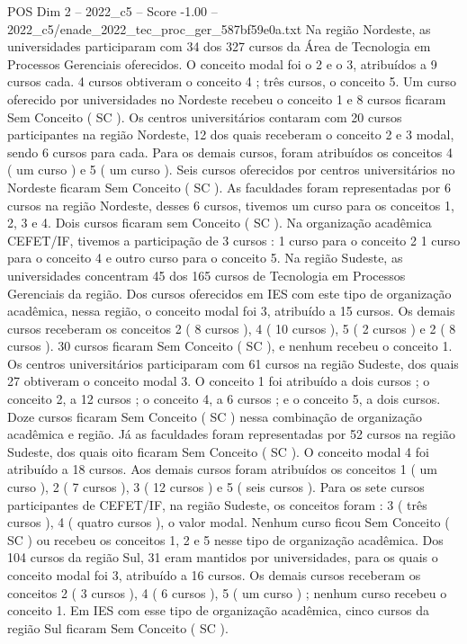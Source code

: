 \begin{textsample}{POS Dim 2 – 2022\_c5 – Score -1.00 – 2022\_c5/enade\_2022\_tec\_proc\_ger\_587bf59e0a.txt}
Na região Nordeste, as universidades participaram com 34 dos 327 cursos da Área de Tecnologia em Processos Gerenciais oferecidos.
O conceito modal foi o 2 e o 3, atribuídos a 9 cursos cada. 4 cursos obtiveram o conceito 4 ; três cursos, o conceito 5.
Um curso oferecido por universidades no Nordeste recebeu o conceito 1 e 8 cursos ficaram Sem Conceito ( SC ).
Os centros universitários contaram com 20 cursos participantes na região Nordeste, 12 dos quais receberam o conceito 2 e 3 modal, sendo 6 cursos para cada.
Para os demais cursos, foram atribuídos os conceitos 4 ( um curso ) e 5 ( um curso ).
Seis cursos oferecidos por centros universitários no Nordeste ficaram Sem Conceito ( SC ).
As faculdades foram representadas por 6 cursos na região Nordeste, desses 6 cursos, tivemos um curso para os conceitos 1, 2, 3 e 4.
Dois cursos ficaram sem Conceito ( SC ).
Na organização acadêmica CEFET/IF, tivemos a participação de 3 cursos : 1 curso para o conceito 2 1 curso para o conceito 4 e outro curso para o conceito 5.
Na região Sudeste, as universidades concentram 45 dos 165 cursos de Tecnologia em Processos Gerenciais da região.
Dos cursos oferecidos em IES com este tipo de organização acadêmica, nessa região, o conceito modal foi 3, atribuído a 15 cursos.
Os demais cursos receberam os conceitos 2 ( 8 cursos ), 4 ( 10 cursos ), 5 ( 2 cursos ) e 2 ( 8 cursos ). 30 cursos ficaram Sem Conceito ( SC ), e nenhum recebeu o conceito 1.
Os centros universitários participaram com 61 cursos na região Sudeste, dos quais 27 obtiveram o conceito modal 3.
O conceito 1 foi atribuído a dois cursos ; o conceito 2, a 12 cursos ; o conceito 4, a 6 cursos ; e o conceito 5, a dois cursos.
Doze cursos ficaram Sem Conceito ( SC ) nessa combinação de organização acadêmica e região.
Já as faculdades foram representadas por 52 cursos na região Sudeste, dos quais oito ficaram Sem Conceito ( SC ).
O conceito modal 4 foi atribuído a 18 cursos.
Aos demais cursos foram atribuídos os conceitos 1 ( um curso ), 2 ( 7 cursos ), 3 ( 12 cursos ) e 5 ( seis cursos ).
Para os sete cursos participantes de CEFET/IF, na região Sudeste, os conceitos foram : 3 ( três cursos ), 4 ( quatro cursos ), o valor modal.
Nenhum curso ficou Sem Conceito ( SC ) ou recebeu os conceitos 1, 2 e 5 nesse tipo de organização acadêmica.
Dos 104 cursos da região Sul, 31 eram mantidos por universidades, para os quais o conceito modal foi 3, atribuído a 16 cursos.
Os demais cursos receberam os conceitos 2 ( 3 cursos ), 4 ( 6 cursos ), 5 ( um curso ) ; nenhum curso recebeu o conceito 1.
Em IES com esse tipo de organização acadêmica, cinco cursos da região Sul ficaram Sem Conceito ( SC ).

\end{textsample}
